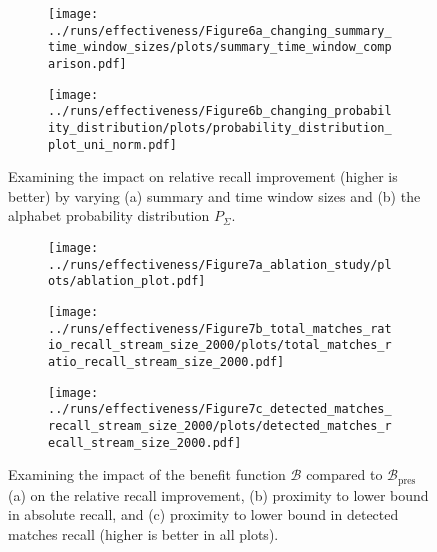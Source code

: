 \setcounter{section}{7}
\setcounter{subsection}{1}
\setcounter{figure}{5}
\begin{figure*}[t]
	\centering
	\begin{subfigure}{.39\linewidth}
		\centering
		\texttt{[image: ../runs/effectiveness/Figure6a\_changing\_summary\_time\_window\_sizes/plots/summary\_time\_window\_comparison.pdf]}
		\vspace{-18pt}
		\caption{}
		\label{plot:summary_size_time_window_size}
	\end{subfigure}
	\hfill
	\begin{subfigure}{.39\linewidth}
		\centering
		\texttt{[image: ../runs/effectiveness/Figure6b\_changing\_probability\_distribution/plots/probability\_distribution\_plot\_uni\_norm.pdf]}
		\vspace{-18pt}
		\caption{}
		\label{plot:different_alphabet_probability_distributions}
	\end{subfigure}

	\vspace{-1em}
	\caption{Examining the impact on relative recall improvement (higher is better) by varying (a) summary and time window sizes and (b) the alphabet probability distribution $P_\Sigma$.}
	\label{fig:summary_size_time_window_size_evaluation_timestamps_query_length}
	\vspace{-1em}
\end{figure*}


\begin{figure*}[t]
	\centering
	\begin{subfigure}{.32\linewidth}
		\centering
		\texttt{[image: ../runs/effectiveness/Figure7a\_ablation\_study/plots/ablation\_plot.pdf]}
		\vspace{-18pt}
		\caption{}
		\label{plot:ablation_study}
	\end{subfigure}
	\begin{subfigure}{.32\linewidth}
		\centering
		\texttt{[image: ../runs/effectiveness/Figure7b\_total\_matches\_ratio\_recall\_stream\_size\_2000/plots/total\_matches\_ratio\_recall\_stream\_size\_2000.pdf]}
		\vspace{-18pt}
		\caption{}
		\label{plot:average_total_match_ratio_recall_2000}
	\end{subfigure}
	\begin{subfigure}{.32\linewidth}
		\centering
		\texttt{[image: ../runs/effectiveness/Figure7c\_detected\_matches\_recall\_stream\_size\_2000/plots/detected\_matches\_recall\_stream\_size\_2000.pdf]}
		\vspace{-18pt}
		\caption{}
		\label{plot:detected_matches_recall_2000}
	\end{subfigure}
	\vspace{-1em}
	\caption{Examining the impact of the benefit function $\mathcal{B}$ compared to $\mathcal{B}_{\text{pres}}$ (a)
	on the relative recall improvement, (b) proximity to lower
	bound in absolute recall, and (c)
	proximity to lower bound in detected matches recall
	(higher is better in all plots).}
	\label{fig:ablation_study_and_recall}
	\vspace{-1em}
\end{figure*}


